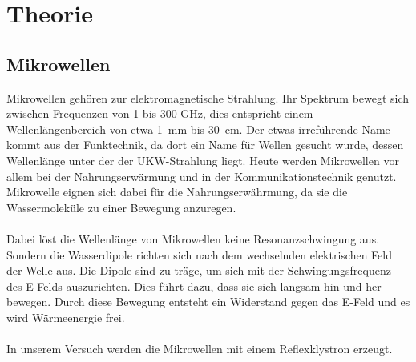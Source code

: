\section{Theorie}
\label{sec:Theorie}

\subsection{Mikrowellen}
Mikrowellen gehören zur elektromagnetische Strahlung.
Ihr Spektrum bewegt sich zwischen Frequenzen von 1 bis 300 \si{\giga\Hz}, dies entspricht einem Wellenlängenbereich von etwa \SI{1}{\milli\meter} bis \SI{30}{\centi\meter}.
Der etwas irreführende Name kommt aus der Funktechnik, da dort ein Name für Wellen gesucht wurde, dessen Wellenlänge unter der der UKW-Strahlung liegt.
Heute werden Mikrowellen vor allem bei der Nahrungserwärmung und in der Kommunikationstechnik genutzt.
Mikrowelle eignen sich dabei für die Nahrungserwährmung, da sie die Wassermoleküle zu einer Bewegung anzuregen.
\\\\
Dabei löst die Wellenlänge von Mikrowellen keine Resonanzschwingung aus. 
Sondern die Wasserdipole richten sich nach dem wechselnden elektrischen Feld der Welle aus.
Die Dipole sind zu träge, um sich mit der Schwingungsfrequenz des E-Felds auszurichten. 
Dies führt dazu, dass sie sich langsam hin und her bewegen.
Durch diese Bewegung entsteht ein Widerstand gegen das E-Feld und es wird Wärmeenergie frei.
\\\\
In unserem Versuch werden die Mikrowellen mit einem Reflexklystron erzeugt.

